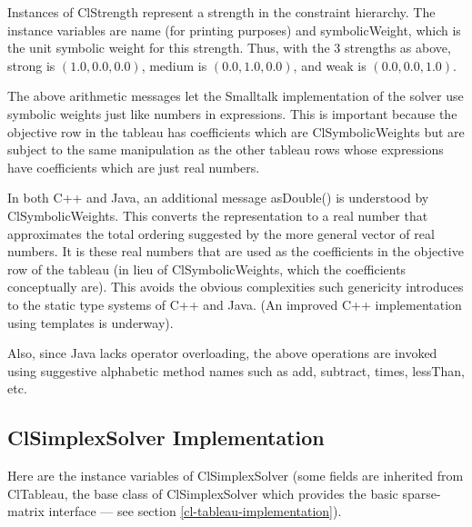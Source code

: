 \documentclass{article}
\begin{document}
Instances of {\sf ClStrength} represent a strength in the constraint
hierarchy.  The instance variables are {\sf name} (for printing
purposes) and {\sf symbolicWeight}, which is the unit symbolic weight
for this strength.  Thus, with the 3 strengths as above, {\sf strong} is
$(1.0, 0.0, 0.0)$, {\sf medium} is $(0.0, 1.0, 0.0)$, and {\sf weak} is
$(0.0, 0.0, 1.0)$.

The above arithmetic messages let the Smalltalk implementation of the
solver use symbolic weights just like numbers in expressions.  This is
important because the objective row in the tableau has coefficients
which are {\sf ClSymbolicWeight}s but are subject to the same
manipulation as the other tableau rows whose expressions have
coefficients which are just real numbers.

In both C++ and Java, an additional message {\sf asDouble()} is understood
by {\sf ClSymbolicWeight}s.  This converts the representation to a real
number that approximates the total ordering suggested by the more
general vector of real numbers.  It is these real numbers that are used
as the coefficients in the objective row of the tableau (in lieu of {\sf
  ClSymbolicWeight}s, which the coefficients conceptually are).  This
avoids the obvious complexities such genericity introduces to the static
type systems of C++ and Java. (An improved C++ implementation using
templates is underway).

Also, since Java lacks operator overloading, the above operations are
invoked using suggestive alphabetic method names such as {\sf add}, {\sf
  subtract}, {\sf times}, {\sf lessThan}, etc.


\subsection{{\sf ClSimplexSolver} Implementation}
\label{cl-simplex-solver-implementation}

Here are the instance variables of {\sf ClSimplexSolver} (some fields
are inherited from {\sf ClTableau}, the base class of {\sf
  ClSimplexSolver} which provides the basic sparse-matrix interface ---
see section \ref{cl-tableau-implementation}).
\end{document}
